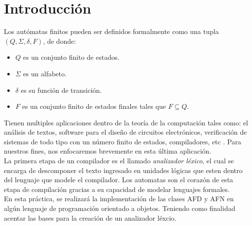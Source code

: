 \section{Introducción}

Los autómatas finitos pueden ser definidos formalmente como una tupla $(Q, \Sigma, \delta, F)$, de donde:

\begin{itemize}
	\item $Q$ es un conjunto finito de estados.
	\item $\Sigma$ es un alfabeto.
	\item $\delta$ es su función de transición.
	\item $F$ es un conjunto finito de estados finales tales que $F \subseteq Q$.
\end{itemize}

Tienen multiples aplicaciones dentro de la teoría de la computación tales como: el análisis de textos, software para el diseño de circuitos electrónicos, verificación de sistemas de todo tipo con un número finito de estados, compiladores, etc \cite{automatas}. Para nuestros fines, nos enfocaremos brevemente en esta última aplicación. \\

La primera etapa de un compilador es el llamado \textit{analizador léxico}, el cual se encarga de descomponer el texto ingresado en unidades lógicas que esten dentro del lenguaje que modele el compilador. Los automatas son el corazón de esta etapa de compilación gracias a su capacidad de modelar lenguajes formales. \\

En esta práctica, se realizará la implementación de las clases AFD y AFN en algún lenguaje de programación orientado a objetos. Teniendo como finalidad acentar las bases para la creación de un analizador léxcio.






